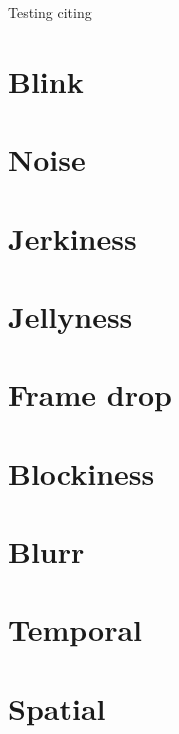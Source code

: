 

Testing citing ~\cite{4799375}

\section{Blink}
\section{Noise}
\section{Jerkiness}
\section{Jellyness}
\section{Frame drop}
\section{Blockiness}
\section{Blurr}
\section{Temporal}
\section{Spatial}

